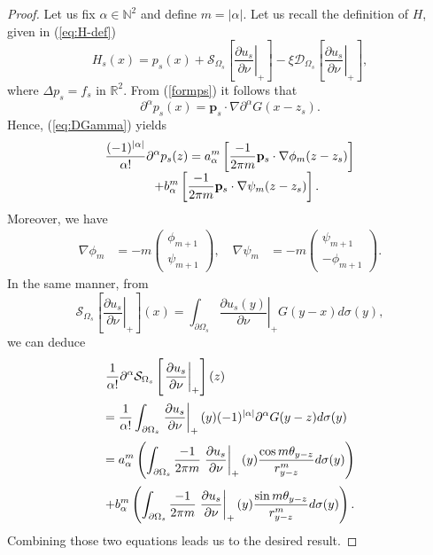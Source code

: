 \begin{proof}
Let us fix $\alpha\in\mathbb{N}^{2}$ and define $m=\vert\alpha\vert$.
Let us recall the definition of $H$, given in (\ref{eq:H-def})
\[
H_{s}(x)=p_{s}(x)+\mathcal{S}_{\Omega_{s}}\left[\left.\frac{\partial
u_{s}}{\partial\nu}\right|_{+}\right]-\xi\mathcal{D}_{\Omega_{s}}\left[\left.\frac{\partial
u_{s}}{\partial\nu}\right|_{+}\right],
\]
where $\Delta p_{s}=f_{s}$ in $\mathbb{R}^{2}$. From
(\ref{formps}) it follows that
\[
\partial^{\alpha}p_{s}(x)=\mathbf{p}_{s}\cdot\nabla\partial^{\alpha}G(x-z_{s}).
\]
Hence, (\ref{eq:DGamma}) yields
\[\begin{array}{l}
\displaystyle \frac{(-1)^{|\alpha|}}{\alpha!}\partial^{\alpha}p_{s}(z) = \displaystyle
a_{\alpha}^{m}\left[\frac{-1}{2\pi
m}\mathbf{p}_{s}\cdot\nabla\phi_{m}(z-z_{s})\right]
\\ \qquad \qquad \displaystyle +b_{\alpha}^{m}\left[\frac{-1}{2\pi
m}\mathbf{p}_{s}\cdot\nabla\psi_{m}(z-z_{s})\right]. \end{array}
\] Moreover, we have
\[
\begin{alignedat}{1}\nabla\phi_{m} & =-m\left(\begin{array}{c}
\phi_{m+1}\\
\psi_{m+1}
\end{array}\right),\quad
\nabla\psi_{m} & =-m\left(\begin{array}{c}
\psi_{m+1}\\
- \phi_{m+1}
\end{array}\right).
\end{alignedat}
\]
In the same manner, from
\[
\mathcal{S}_{\Omega_{s}}\left[\left.\frac{\partial
u_{s}}{\partial\nu}\right|_{+}\right](x)=\int_{\partial\Omega_{s}}\left.\frac{\partial
u_{s}(y)}{\partial\nu}\right|_{+} G(y-x)d\sigma(y),
\]
we can deduce
\[
\begin{array}{l}
\ds \frac{1}{\alpha!}
\partial^{\alpha}\mathcal{S}_{\Omega_{s}}\left[\left.\frac{\partial
u_{s}}{\partial\nu}\right|_{+}\right](z)  \\ \nm \ds =
\frac{1}{\alpha!} \int_{\partial\Omega_{s}}\left.\frac{\partial
u_{s}}{\partial\nu}\right|_{+}(y)(-1)^{|\alpha|}\partial^{\alpha}G(y-z)d\sigma(y)\\
 \nm \ds =a_{\alpha}^{m}\left(\int_{\partial\Omega_{s}}\frac{-1}{2\pi m}\left.
 \frac{\partial u_{s}}{\partial\nu}\right|_{+}(y)\frac{\cos
 m\theta_{y-z}}{r_{y-z}^{m}}d\sigma(y)\right)\\
\nm \ds
+b_{\alpha}^{m}\left(\int_{\partial\Omega_{s}}\frac{-1}{2\pi
m}\left.\frac{\partial u_{s}}{\partial\nu}\right|_{+}(y)
 \frac{\sin m\theta_{y-z}}{r_{y-z}^{m}}d\sigma(y)\right).
\end{array}
\]
Combining those two equations leads us to the desired result.
\end{proof}
